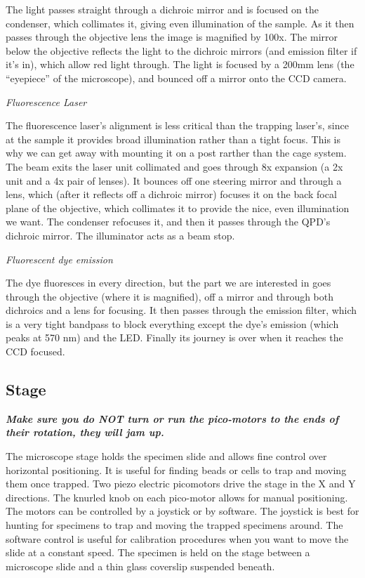 \documentclass{../lab}
\begin{document}
The light passes straight through a dichroic mirror and is focused on the condenser, which collimates it, giving even illumination of the sample. As it then passes through the objective lens the image is magnified by 100x. The mirror below the objective reflects the light to the dichroic mirrors (and emission filter if it's in), which allow red light through. The light is focused by a 200mm lens (the ``eyepiece'' of the microscope), and bounced off a mirror onto the CCD camera.

\emph{Fluorescence Laser}

The fluorescence laser's alignment is less critical than the trapping laser's, since at the sample it provides broad illumination rather than a tight focus. This is why we can get away with mounting it on a post rarther than the cage system. The beam exits the laser unit collimated and goes through 8x expansion (a 2x unit and a 4x pair of lenses). It bounces off one steering mirror and through a lens, which (after it reflects off a dichroic mirror) focuses it on the back focal plane of the objective, which collimates it to provide the nice, even illumination we want. The condenser refocuses it, and then it passes through the QPD's dichroic mirror. The illuminator acts as a beam stop.

\emph{Fluorescent dye emission}

The dye fluoresces in every direction, but the part we are interested in goes through the objective (where it is magnified), off a mirror and through both dichroics and a lens for focusing. It then passes through the emission filter, which is a very tight bandpass to block everything except the dye's emission (which peaks at 570 nm) and the LED. Finally its journey is over when it reaches the CCD focused.

\subsection{Stage}

\emph{\textbf{Make sure you do NOT turn or run the pico-motors to the ends of their rotation, they will jam up.}}

The microscope stage holds the specimen slide and allows fine control over horizontal positioning. It is useful for finding beads or cells to trap and moving them once trapped. Two piezo electric picomotors drive the stage in the X and Y directions. The knurled knob on each pico-motor allows for manual positioning. The motors can be controlled by a joystick or by software. The joystick is best for hunting for specimens to trap and moving the trapped specimens around. The software control is useful for calibration procedures when you want to move the slide at a constant speed. The specimen is held on the stage between a microscope slide and a thin glass coverslip suspended beneath.
\end{document}
